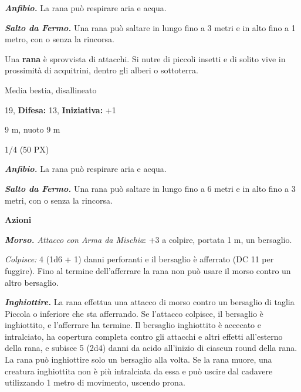 \begin{multicols}{2}
{\emph{\textbf{Anfibio.}} La rana può respirare aria e acqua.

\emph{\textbf{Salto da Fermo.}} Una rana può saltare in lungo fino a 3 metri e in alto fino a 1 metro, con o senza la rincorsa.

Una \textbf{rana} è sprovvista di attacchi. Si nutre di piccoli insetti e di solito vive in prossimità di acquitrini, dentro gli alberi o sottoterra.

\begin{description}[noitemsep, topsep=0pt, parsep=0pt, partopsep=0pt, leftmargin=0cm, labelwidth=2.2cm]
    \item[\textbf{Taglia/Tipo:}] Media bestia, disallineato
    \item[\textbf{Caratt.:}] 
    \item[\textbf{Punti Ferita:}] 19,  \textbf{Difesa:} 13,  \textbf{Iniziativa:} +1
    \item[\textbf{Tiri Salvez.:}] 
    \item[\textbf{Movimento:}] 9 m, nuoto 9 m
    \item[\textbf{Sfida:}] 1/4 (50 PX)\smallskip
\end{description}

\emph{\textbf{Anfibio.}} La rana può respirare aria e acqua.

\emph{\textbf{Salto da Fermo.}} Una rana può saltare in lungo fino a 6 metri e in alto fino a 3 metri, con o senza la rincorsa.

\textbf{Azioni}

\emph{\textbf{Morso.} Attacco con Arma da Mischia}: +3 a colpire, portata 1 m, un bersaglio.

\emph{Colpisce:} 4 (1d6 + 1) danni perforanti e il bersaglio è afferrato (DC 11 per fuggire). Fino al termine dell'afferrare la rana non può usare il morso contro un altro bersaglio.

\emph{\textbf{Inghiottire.}} La rana effettua una attacco di morso contro un bersaglio di taglia Piccola o inferiore che sta afferrando. Se l'attacco colpisce, il bersaglio è inghiottito, e l'afferrare ha termine. Il bersaglio inghiottito è accecato e intralciato, ha copertura completa contro gli attacchi e altri effetti all'esterno della rana, e subisce 5 (2d4) danni da acido all'inizio di ciascun round della rana. La rana può inghiottire solo un bersaglio alla volta. Se la rana muore, una creatura inghiottita non è più intralciata da essa e può uscire dal cadavere utilizzando 1 metro di movimento, uscendo prona.

}
\end{multicols}
